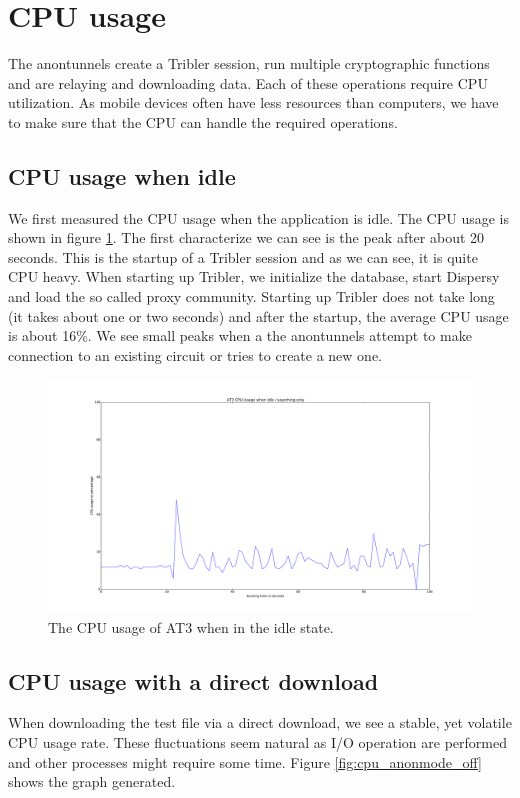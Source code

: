 \section{CPU usage}
\label{sec:cpu-usage}
	The anontunnels create a Tribler session, run multiple cryptographic functions and are relaying and downloading data. Each of these operations require CPU utilization. As mobile devices often have less resources than computers, we have to make sure that the CPU can handle the required operations.
	
	\subsection{CPU usage when idle}
		We first measured the CPU usage when the application is idle. The CPU usage is shown in figure \ref{fig:cpu_idle_graph}. The first characterize we can see is the peak after about 20 seconds. This is the startup of a Tribler session and as we can see, it is quite CPU heavy. When starting up Tribler, we initialize the database, start Dispersy and load the so called proxy community. Starting up Tribler does not take long (it takes about one or two seconds) and after the startup, the average CPU usage is about 16\%. We see small peaks when a the anontunnels attempt to make connection to an existing circuit or tries to create a new one.
	
		\begin{figure}[!htb]
			\centering
			\includegraphics[width=\textwidth]{graphics/cpu_idle.pdf}
			\caption{The CPU usage of AT3 when in the idle state.}
			\label{fig:cpu_idle_graph}
		\end{figure}
		
	\subsection{CPU usage with a direct download}
		When downloading the test file via a direct download, we see a stable, yet volatile CPU usage rate.
		These fluctuations seem natural as I/O operation are performed and other processes might require some time. 
		Figure \ref{fig:cpu_anonmode_off} shows the graph generated.
		
